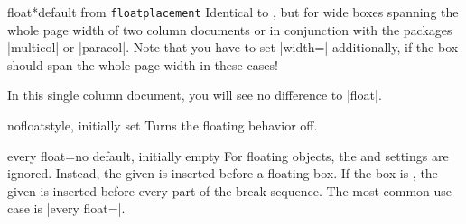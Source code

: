 \begin{docTcbKey}{float*}{}{default from \texttt{floatplacement}}
  Identical to , but for wide boxes spanning the whole page
  width of two column documents or in conjunction with the packages
  |multicol| or |paracol|. Note that you have to set |width=\textwidth|
  additionally, if the box should span the whole page width in these cases!
\begin{dispListing}
\begin{tcolorbox}[float*=b, title=Floating box from |float*|,width=\textwidth,
    enhanced,watermark text={I'm also floating}]
  In this single column document, you will see no difference to |float|.
\end{tcolorbox}
\end{dispListing}
\end{docTcbKey}
{\tcbusetemp}


\begin{docTcbKey}{nofloat}{}{style, initially set}
  Turns the floating behavior off.
\end{docTcbKey}


\begin{docTcbKey}[][doc new=2014-09-19]{every float}{=}{no default, initially empty}
  For floating objects, the  and 
  settings are ignored. Instead, the given  is inserted before
  a floating box. If the box is , the given  is
  inserted before every part of the break sequence.
  The most common use case is |every float=\centering|.

\begin{dispListing}
\end{dispListing}
{\tcbusetemp}

\end{docTcbKey}


